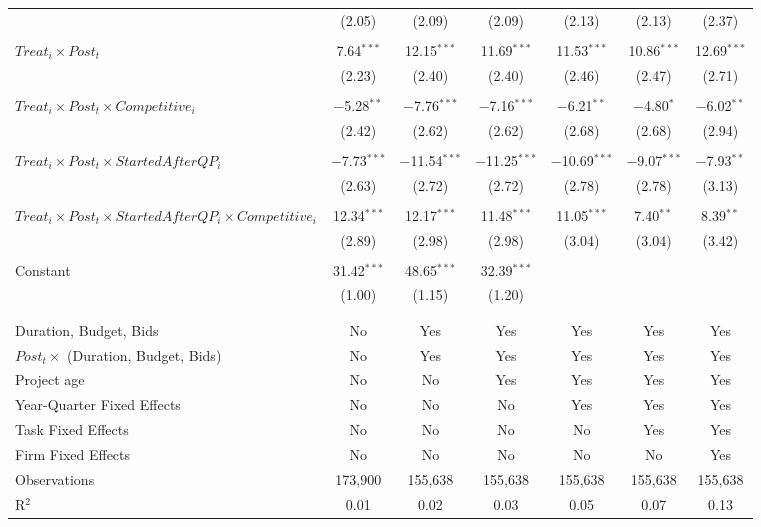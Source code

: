 \documentclass[
]{article}
\begin{document}
\begin{table}[H]
\begin{tabular}{@{\extracolsep{-3pt}}lcccccc}
  & (2.05) & (2.09) & (2.09) & (2.13) & (2.13) & (2.37) \\ 
  & & & & & & \\ 
 $Treat_i \times Post_t$ & 7.64$^{***}$ & 12.15$^{***}$ & 11.69$^{***}$ & 11.53$^{***}$ & 10.86$^{***}$ & 12.69$^{***}$ \\ 
  & (2.23) & (2.40) & (2.40) & (2.46) & (2.47) & (2.71) \\ 
  & & & & & & \\ 
 $Treat_i \times Post_t \times Competitive_i$ & $-$5.28$^{**}$ & $-$7.76$^{***}$ & $-$7.16$^{***}$ & $-$6.21$^{**}$ & $-$4.80$^{*}$ & $-$6.02$^{**}$ \\ 
  & (2.42) & (2.62) & (2.62) & (2.68) & (2.68) & (2.94) \\ 
  & & & & & & \\ 
 $Treat_i \times Post_t \times StartedAfterQP_i$ & $-$7.73$^{***}$ & $-$11.54$^{***}$ & $-$11.25$^{***}$ & $-$10.69$^{***}$ & $-$9.07$^{***}$ & $-$7.93$^{**}$ \\ 
  & (2.63) & (2.72) & (2.72) & (2.78) & (2.78) & (3.13) \\ 
  & & & & & & \\ 
 $Treat_i \times Post_t \times StartedAfterQP_i \times Competitive_i$ & 12.34$^{***}$ & 12.17$^{***}$ & 11.48$^{***}$ & 11.05$^{***}$ & 7.40$^{**}$ & 8.39$^{**}$ \\ 
  & (2.89) & (2.98) & (2.98) & (3.04) & (3.04) & (3.42) \\ 
  & & & & & & \\ 
 Constant & 31.42$^{***}$ & 48.65$^{***}$ & 32.39$^{***}$ &  &  &  \\ 
  & (1.00) & (1.15) & (1.20) &  &  &  \\ 
  & & & & & & \\ 
\hline \\[-1.8ex] 
Duration, Budget, Bids & No & Yes & Yes & Yes & Yes & Yes \\ 
$Post_t \times $  (Duration, Budget, Bids) & No & Yes & Yes & Yes & Yes & Yes \\ 
Project age & No & No & Yes & Yes & Yes & Yes \\ 
Year-Quarter Fixed Effects & No & No & No & Yes & Yes & Yes \\ 
Task Fixed Effects & No & No & No & No & Yes & Yes \\ 
Firm Fixed Effects & No & No & No & No & No & Yes \\ 
Observations & 173,900 & 155,638 & 155,638 & 155,638 & 155,638 & 155,638 \\ 
R$^{2}$ & 0.01 & 0.02 & 0.03 & 0.05 & 0.07 & 0.13 \\ 

\end{tabular}
\end{table}
\end{document}
